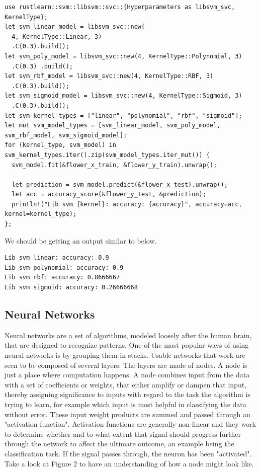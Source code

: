 \documentclass{book}
\begin{document}
\begin{lstlisting}[caption={chapter3\\/rustlearn\_classification\_tasks\\/src\\/trees\\.rs}]
use rustlearn::svm::libsvm::svc::{Hyperparameters as libsvm_svc, KernelType};
let svm_linear_model = libsvm_svc::new(
  4, KernelType::Linear, 3)
  .C(0.3).build();
let svm_poly_model = libsvm_svc::new(4, KernelType::Polynomial, 3)
  .C(0.3) .build();
let svm_rbf_model = libsvm_svc::new(4, KernelType::RBF, 3)
  .C(0.3).build();
let svm_sigmoid_model = libsvm_svc::new(4, KernelType::Sigmoid, 3)
  .C(0.3).build();
let svm_kernel_types = ["linear", "polynomial", "rbf", "sigmoid"];
let mut svm_model_types = [svm_linear_model, svm_poly_model, svm_rbf_model, svm_sigmoid_model];
for (kernel_type, svm_model) in svm_kernel_types.iter().zip(svm_model_types.iter_mut()) {
  svm_model.fit(&flower_x_train, &flower_y_train).unwrap();

  let prediction = svm_model.predict(&flower_x_test).unwrap();
  let acc = accuracy_score(&flower_y_test, &prediction);
  println!("Lib svm {kernel}: accuracy: {accuracy}", accuracy=acc, kernel=kernel_type);
};
\end{lstlisting}

We should be getting an output similar to below.

\begin{lstlisting}[caption={output}]
Lib svm linear: accuracy: 0.9
Lib svm polynomial: accuracy: 0.9
Lib svm rbf: accuracy: 0.8666667
Lib svm sigmoid: accuracy: 0.26666668
\end{lstlisting}


\label{sub:support_vector_machines}

\subsection{Neural Networks}%

Neural networks are a set of algorithms, modeled loosely after the human brain, that are designed to recognize patterns. One of the most popular ways of using neural networks is by grouping them in stacks. Usable networks that work are seen to be composed of several layers. The layers are made of nodes. A node is just a place where computation happens. A node combines input from the data with a set of coefficients or weights, that either amplify or dampen that input, thereby assigning significance to inputs with regard to the task the algorithm is trying to learn, for example which input is most helpful in classifying the data without error. These input weight products are summed and passed through an "activation function". Activation functions are generally non-linear and they work to determine whether and to what extent that signal should progress further through the network to affect the ultimate outcome, an example being the classification task. If the signal passes through, the neuron has been "activated". Take a look at Figure 2 to have an understanding of how a node might look like.
\end{document}
